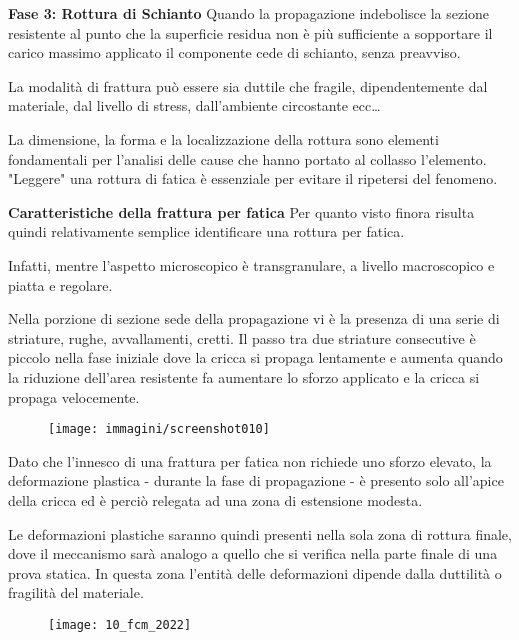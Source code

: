 \documentclass{article}
\begin{document}
\begin{adjustwidth}{2in}{}
		\textbf{Fase 3: Rottura di Schianto} \newline
		Quando la propagazione indebolisce la sezione resistente al punto che la superficie residua non è più sufficiente a sopportare il carico massimo applicato il componente cede di schianto, senza preavviso.
		
		La modalità di frattura può essere sia duttile che fragile, dipendentemente dal materiale, dal livello di stress, dall'ambiente circostante ecc\dots
		
		La dimensione, la forma e la localizzazione della rottura sono elementi fondamentali per l'analisi delle cause che hanno portato al collasso l’elemento. "Leggere" una rottura di fatica è essenziale per evitare il ripetersi del fenomeno. \newline
		
		\textbf{\Large Caratteristiche della frattura per fatica} \newline
		Per quanto visto finora risulta quindi relativamente semplice identificare una rottura per fatica.
		
		Infatti, mentre l'aspetto microscopico è transgranulare, a livello macroscopico e piatta e regolare. 
		
		Nella porzione di sezione sede della propagazione vi è la presenza di una serie di striature, rughe, avvallamenti, cretti. Il passo tra due striature consecutive è piccolo nella fase iniziale dove la cricca si propaga lentamente e aumenta quando la riduzione dell’area resistente fa aumentare lo sforzo applicato e la cricca si propaga velocemente. 
		
		\begin{figure}[H]
			\centering
			\texttt{[image: immagini/screenshot010]}
			\label{fig:screenshot010}
		\end{figure}		
		
		Dato che l'innesco di una frattura per fatica non richiede uno sforzo elevato, la deformazione plastica - durante la fase di propagazione - è presento solo all'apice della cricca ed è perciò relegata ad una zona di estensione modesta. 
		
		Le deformazioni plastiche saranno quindi presenti nella sola zona di rottura finale, dove il meccanismo sarà analogo a quello che si verifica nella parte finale di una prova statica. In questa zona l’entità delle
		deformazioni dipende dalla duttilità o fragilità del materiale.
		
		 \end{adjustwidth}
		\begin{figure}[H]
		\texttt{[image: 10\_fcm\_2022]}
		\end{figure}
\end{document}

